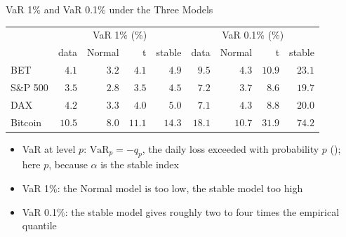 \begin{frame}{VaR 1\% and VaR 0.1\% under the Three Models}
\itemsize{\small}
\begin{center}
\footnotesize
\begin{tabular}{l|rrrr|rrrr}
\toprule
& \multicolumn{4}{c|}{VaR 1\% (\%)} & \multicolumn{4}{c}{VaR 0.1\% (\%)} \\ & data & Normal & t & stable & data & Normal & t & stable \\
\midrule
BET & $4.1$ & $3.2$ & $4.1$ & $4.9$ & $9.5$ & $4.3$ & $10.9$ & $23.1$ \\
S\&P 500 & $3.5$ & $2.8$ & $3.5$ & $4.5$ & $7.2$ & $3.7$ & $8.6$ & $19.7$ \\
DAX & $4.2$ & $3.3$ & $4.0$ & $5.0$ & $7.1$ & $4.3$ & $8.8$ & $20.0$ \\
Bitcoin & $10.5$ & $8.0$ & $11.1$ & $14.3$ & $18.1$ & $10.7$ & $31.9$ & $74.2$ \\
\bottomrule
\end{tabular}
\end{center}
\begin{itemize}
    \item VaR at level $p$: $\mathrm{VaR}_p = -q_p$, the daily loss exceeded with probability $p$ (); here $p$, because $\alpha$ is the stable index
    \item VaR 1\%: the Normal model is too low, the stable model too high
    \item VaR 0.1\%: the stable model gives roughly two to four times the empirical quantile
\end{itemize}
\end{frame}


